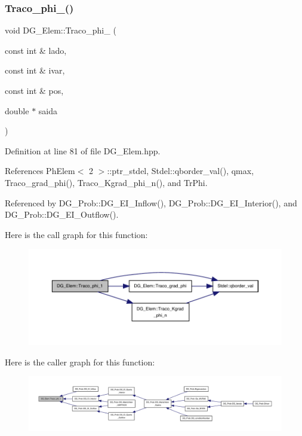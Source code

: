 \subsubsection{\texorpdfstring{Traco\+\_\+phi\+\_()}{Traco\_phi\_1()}}
{\footnotesize\ttfamily void D\+G\+\_\+\+Elem\+::\+Traco\+\_\+phi\+\_ (\begin{DoxyParamCaption}\item[{const int \&}]{lado,  }\item[{const int \&}]{ivar,  }\item[{const int \&}]{pos,  }\item[{double $\ast$}]{saida }\end{DoxyParamCaption})\hspace{0.3cm}{\ttfamily [inline]}}



Definition at line 81 of file D\+G\+\_\+\+Elem.\+hpp.



References Ph\+Elem$<$ 2 $>$\+::ptr\+\_\+stdel, Stdel\+::qborder\+\_\+val(), qmax, Traco\+\_\+grad\+\_\+phi(), Traco\+\_\+\+Kgrad\+\_\+phi\+\_\+n(), and Tr\+Phi.



Referenced by D\+G\+\_\+\+Prob\+::\+D\+G\+\_\+\+E\+I\+\_\+\+Inflow(), D\+G\+\_\+\+Prob\+::\+D\+G\+\_\+\+E\+I\+\_\+\+Interior(), and D\+G\+\_\+\+Prob\+::\+D\+G\+\_\+\+E\+I\+\_\+\+Outflow().

Here is the call graph for this function\+:
\nopagebreak
\begin{figure}[H]
\begin{center}
\leavevmode
\includegraphics[width=350pt]{classDG__Elem_a99f9e69fc0d6eacd683712bc456af5f7_cgraph}
\end{center}
\end{figure}
Here is the caller graph for this function\+:
\nopagebreak
\begin{figure}[H]
\begin{center}
\leavevmode
\includegraphics[width=350pt]{classDG__Elem_a99f9e69fc0d6eacd683712bc456af5f7_icgraph}
\end{center}
\end{figure}
\mbox{\label{classDG__Elem_ab57a34a01c448785d8a887e51e7ab331}} 
